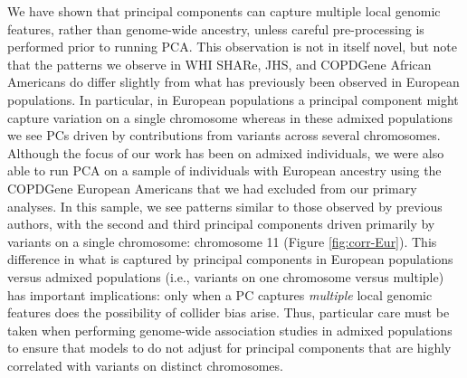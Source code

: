 \documentclass[12pt]{article}
\begin{document}
We have shown that principal components can capture multiple local genomic features, rather than genome-wide ancestry, unless careful pre-processing is performed prior to running PCA.
This observation is not in itself novel, but note that the patterns we observe in WHI SHARe, JHS, and COPDGene African Americans do differ slightly from what has previously been observed in European populations.
In particular, in European populations a principal component might capture variation on a single chromosome \citep{zou2010, prive2020} whereas in these admixed populations we see PCs driven by contributions from variants across several chromosomes.
Although the focus of our work has been on admixed individuals, we were also able to run PCA on a sample of individuals with European ancestry using the COPDGene European Americans that we had excluded from our primary analyses. 
In this sample, we see patterns similar to those observed by previous authors, with the second and third principal components driven primarily by variants on a single chromosome: chromosome 11 (Figure \ref{fig:corr-Eur}).
This difference in what is captured by principal components in European populations versus admixed populations (i.e., variants on one chromosome versus multiple) has important implications: only when a PC captures \textit{multiple} local genomic features does the possibility of collider bias arise.
Thus, particular care must be taken when performing genome-wide association studies in admixed populations to ensure that models to do not adjust for principal components that are highly correlated with variants on distinct chromosomes.
\end{document}
